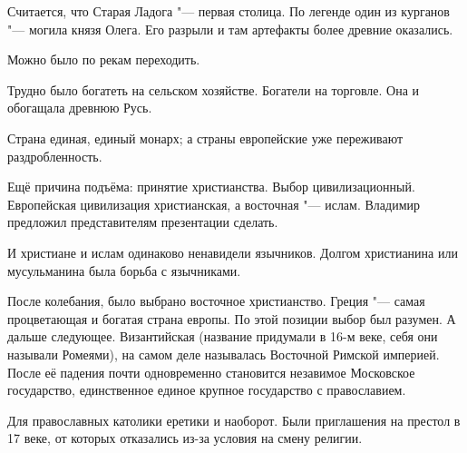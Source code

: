 Считается, что Старая Ладога "--- первая столица. По легенде один из курганов "--- могила князя Олега. Его разрыли и там артефакты более древние оказались.

Можно было по рекам переходить.

Трудно было богатеть на сельском хозяйстве. Богатели на торговле. Она и обогащала древнюю Русь.

Страна единая, единый монарх; а страны европейские уже переживают раздробленность.

Ещё причина подъёма: принятие христианства. Выбор цивилизационный. Европейская цивилизация христианская, а восточная "--- ислам. Владимир предложил представителям презентации сделать.

И христиане и ислам одинаково ненавидели язычников. Долгом христианина или мусульманина была борьба с язычниками.

После колебания, было выбрано восточное христианство. Греция "--- самая процветающая и богатая страна европы. По этой позиции выбор был разумен. А дальше следующее. Византийская (название придумали в 16-м веке, себя они называли Ромеями), на самом деле называлась Восточной Римской империей. После её падения почти одновременно становится незавимое Московское государство, единственное единое крупное государство с православием.

Для православных католики еретики и наоборот. Были приглашения на престол в 17 веке, от которых отказались из-за условия на смену религии.
